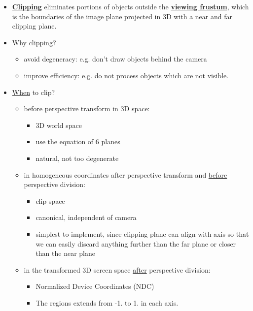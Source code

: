 \documentclass[twocolumn,landscape,10pt]{article}
\theoremstyle{definition}
\begin{document}
\begin{itemize}
    \item \underline{\textbf{Clipping}} eliminates portions of objects outside
        the \underline{\textbf{viewing frustum}}, which is the boundaries of the
        image plane projected in 3D with a near and far clipping plane.
    \item \underline{Why} clipping?
        \begin{itemize}
            \item avoid degeneracy: e.g. don't draw objects behind the camera
            \item improve efficiency: e.g. do not process objects which are not visible.
        \end{itemize} 
    \item \underline{When} to clip?
        \begin{itemize}
            \item before perspective transform in 3D space:
                \begin{itemize}
                    \item 3D world space
                    \item use the equation of 6 planes
                    \item natural, not too degenerate
                \end{itemize} 
            \item in homogeneous coordinates after perspective transform 
                and \underline{before} perspective division:
                \begin{itemize}
                    \item clip space
                    \item canonical, independent of camera
                    \item simplest to implement, since clipping plane can align
                        with axis so that we can easily discard anything further
                        than the far plane or closer than the near plane
                \end{itemize} 
            \item in the transformed 3D screen space \underline{after} 
                perspective division:
                \begin{itemize}
                    \item Normalized Device Coordinates (NDC)
                    \item The regions extends from -1. to 1. in each axis.

\end{itemize}
\end{itemize}
\end{itemize}
\end{document}
